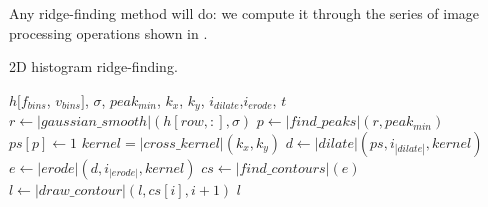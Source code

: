 \documentclass[pdflatex,sn-mathphys]{sn-jnl}%
\theoremstyle{thmstyleone}%
\theoremstyle{thmstyletwo}%
\theoremstyle{thmstylethree}%
\begin{document}
Any ridge-finding method will do: we compute it through the series of image processing operations shown in
.


\begin{algorithm}
    \caption{2D histogram ridge-finding.}
    \label{alg:material}
    \begin{algorithmic}
         {$h[f_{bins}$, $v_{bins}]$, $\sigma$, $peak_{min}$, $k_x$, $k_y$, \newline \indent \indent $i_{dilate}$,$i_{erode}$, $t$}
                \State $r \gets |gaussian\_smooth|(h[row,:], \sigma)$
                \State $p \gets |find\_peaks|(r, peak_{min})$
                \State $ps[p] \gets 1$
            \EndFor
            \State $kernel = |cross\_kernel|(k_x, k_y)$
            \State $d \gets |dilate|(ps, i_{|dilate|}, kernel)$
            \State $e \gets |erode|(d, i_{|erode|}, kernel)$
            \State $cs \gets |find\_contours|(e)$
                    \State $l \gets |draw\_contour|(l, cs[i], i+1)$
                \EndIf
            \EndFor
            \State \Return $l$
        \EndFunction
    \end{algorithmic}
\end{algorithm}
\end{document}
